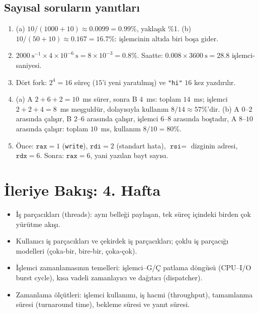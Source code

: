 \documentclass[11pt,a4paper]{article}
\newcommand{\cmd}[1]{\texttt{#1}}
\begin{document}
\subsection*{Sayısal soruların yanıtları}
\begin{enumerate}[leftmargin=1.6em,start=8]
  \item (a) $10/(1000 + 10) \approx 0.0099 = 0.99\%$, yaklaşık \%1. (b) $10/(50 + 10) \approx 0.167 = 16.7\%$: işlemcinin altıda biri boşa gider.
  \item $2000\ \text{s}^{-1} \times 4\times10^{-6}\ \text{s} = 8\times10^{-3} = 0.8\%$. Saatte: $0.008 \times 3600\ \text{s} = 28.8$ işlemci-saniyesi.
  \item Dört fork: $2^{4} = 16$ süreç ($15$'i yeni yaratılmış) ve \texttt{"hi"} $16$ kez yazdırılır.
  \item (a) A $2 + 6 + 2 = 10$~ms sürer, sonra B $4$~ms: toplam $14$~ms; işlemci $2 + 2 + 4 = 8$~ms meşguldür, dolayısıyla kullanım $8/14 \approx 57\%$'dir. (b) A $0$--$2$ arasında çalışır, B $2$--$6$ arasında çalışır, işlemci $6$--$8$ arasında boştadır, A $8$--$10$ arasında çalışır: toplam $10$~ms, kullanım $8/10 = 80\%$.
  \item Önce: $\texttt{rax} = 1$ (\cmd{write}), $\texttt{rdi} = 2$ (standart hata), $\texttt{rsi} =$ dizginin adresi, $\texttt{rdx} = 6$. Sonra: $\texttt{rax} = 6$, yani yazılan bayt sayısı.
\end{enumerate}

\section{İleriye Bakış: 4. Hafta}

\begin{itemize}
  \item İş parçacıkları (threads): aynı belleği paylaşan, tek süreç içindeki birden çok yürütme akışı.
  \item Kullanıcı iş parçacıkları ve çekirdek iş parçacıkları; çoklu iş parçacığı modelleri (çoka-bir, bire-bir, çoka-çok).
  \item İşlemci zamanlamasının temelleri: işlemci--G/Ç patlama döngüsü (CPU--I/O burst cycle), kısa vadeli zamanlayıcı ve dağıtıcı (dispatcher).
  \item Zamanlama ölçütleri: işlemci kullanımı, iş hacmi (throughput), tamamlanma süresi (turnaround time), bekleme süresi ve yanıt süresi.
\end{itemize}
\end{document}
